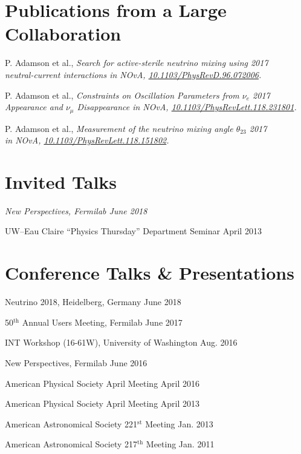 \documentclass[11pt]{cv}
\begin{document}
\begin{cv}
\section{Publications from a Large Collaboration}
\begin{etaremune}
  \item P. Adamson et al., \it Search for active-sterile neutrino mixing using \rm \hfill 2017 \\
  \it neutral-current interactions in NOvA, \rm \href{https://doi.org/10.1103/PhysRevD.96.072006}{10.1103/PhysRevD.96.072006}.
  \item P. Adamson et al., \it Constraints on Oscillation Parameters from $\nu_e$ \rm \hfill 2017 \\
  \it  Appearance and $\nu_\mu$ Disappearance in NOvA, \rm \href{https://doi.org/10.1103/PhysRevLett.118.231801}{10.1103/PhysRevLett.118.231801}.
  \item P. Adamson et al., \it Measurement of the neutrino mixing angle $\theta_{23}$ \rm \hfill 2017 \\
  \it in NOvA, \rm \href{https://doi.org/10.1103/PhysRevLett.118.151802}{10.1103/PhysRevLett.118.151802}.
\end{etaremune}


\section{Invited Talks}
\begin{etaremune}
  \item \it New Perspectives, Fermilab \hfill June 2018 \rm
  \item UW--Eau Claire ``Physics Thursday'' Department Seminar \hfill April 2013
\end{etaremune}


\section{Conference Talks \& Presentations}
\begin{etaremune}
  \item Neutrino 2018, Heidelberg, Germany \hfill June 2018
  \item 50$^{\text{th}}$ Annual Users Meeting, Fermilab \hfill June 2017
  \item INT Workshop (16-61W), University of Washington \hfill Aug. 2016
  \item New Perspectives, Fermilab \hfill June 2016
  \item American Physical Society April Meeting \hfill April 2016
  \item American Physical Society April Meeting \hfill April 2013
  \item American Astronomical Society 221${^\text{st}}$ Meeting \hfill Jan. 2013
  \item American Astronomical Society 217${^\text{th}}$ Meeting \hfill Jan. 2011
\end{etaremune}



\end{cv}
\end{document}
